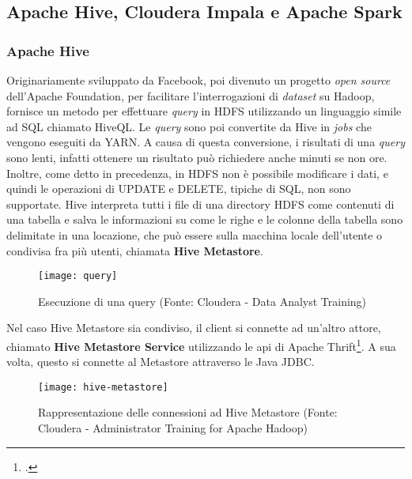 \subsection{Apache Hive, Cloudera Impala e Apache Spark}
\subsubsection{Apache Hive}
Originariamente sviluppato da Facebook, poi divenuto un progetto \textit{open source} dell'Apache Foundation, per facilitare l'interrogazioni di \textit{dataset} su Hadoop, fornisce un metodo per effettuare \textit{query} in HDFS utilizzando un linguaggio simile ad SQL chiamato HiveQL. 
Le \textit{query} sono poi convertite da Hive in \textit{jobs} che vengono eseguiti da YARN. A causa di questa conversione, i risultati di una \textit{query} sono lenti, infatti ottenere un risultato può richiedere anche minuti se non ore. Inoltre, come detto in precedenza, in HDFS non è possibile modificare i dati, e quindi le operazioni di UPDATE e DELETE, tipiche di SQL, non sono supportate.
Hive interpreta tutti i file di una directory HDFS come contenuti di una tabella e salva le informazioni su come le righe e le colonne della tabella sono delimitate in una locazione, che può essere sulla macchina locale dell'utente o condivisa fra più utenti, chiamata \textbf{Hive Metastore}.
\begin{figure}[!h]
	\centering
	\texttt{[image: query]}
	\caption{Esecuzione di una query (Fonte: Cloudera - Data Analyst Training)}
\end{figure}
Nel caso Hive Metastore sia condiviso, il client si connette ad un'altro attore, chiamato \textbf{Hive Metastore Service} utilizzando le \gls{api} di Apache Thrift\footcite{https://thrift.apache.org/}. A sua volta, questo si connette al Metastore attraverso le Java JDBC.
\begin{figure}[!h]
	\centering
	\texttt{[image: hive-metastore]}
	\caption{Rappresentazione delle connessioni ad Hive Metastore (Fonte: Cloudera - Administrator Training for Apache Hadoop)}
\end{figure}

